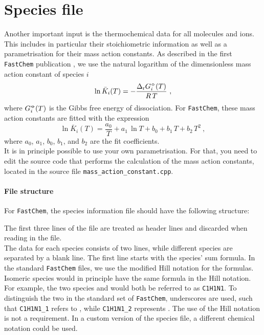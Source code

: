 \documentclass[numbers=noenddot]{aux/fcmanual}
\let\ce\ch
\newcommand{\fc}{\texttt{FastChem}\xspace}
\begin{document}
\section{Species file}

Another important input is the thermochemical data for all molecules and ions. This includes in particular their stoichiometric information as well as a parametrisation for their mass action constants. As described in the first \fc publication \citep{Stock2018MNRAS.479..865S}, we use the natural logarithm of the dimensionless mass action constant of species $i$
\begin{equation}
\ln\bar{K}_i(T) = - \frac{\Delta_\mathrm{r} G_i^\minuso(T)}{R\,T} \ ,
\label{eq:lnK}
\end{equation}
where $G_i^\minuso(T)$ is the Gibbs free energy of dissociation. 
For \fc, these mass action constants are fitted with the expression
\begin{equation}
\ln\bar{K}_i(T) = \frac{a_0}{T} + a_1\,\ln T + b_0 + b_1\,T + b_2\,T^2 \ ,
\label{eq:fit}
\end{equation}
where $a_0$, $a_1$, $b_0$, $b_1$, and $b_2$ are the fit coefficients.\\
It is in principle possible to use your own parametrisation. For that, you need to edit the source code that performs the calculation of the mass action constants, located in the source file \verb|mass_action_constant.cpp|.

\paragraph{File structure}
For \fc, the species information file should have the following structure:

The first three lines of the file are treated as header lines and discarded when reading in the file. \\

The data for each species consists of two lines, while different species are separated by a blank line.
The first line starts with the species' sum formula. In the standard \fc files, we use the modified Hill notation for the formulas. Isomeric species would in principle have the same formula in the Hill notation. For example, the two species \ce{HCN} and \ce{HNC} would both be referred to as \texttt{C1H1N1}. To distinguish the two in the standard set of \fc, underscores are used, such that \texttt{C1H1N1\_1} refers to \ce{HCN}, while \texttt{C1H1N1\_2} represents \ce{HNC}.
The use of the Hill notation is not a requirement. In a custom version of the species file, a different chemical notation could be used.\\
\end{document}
